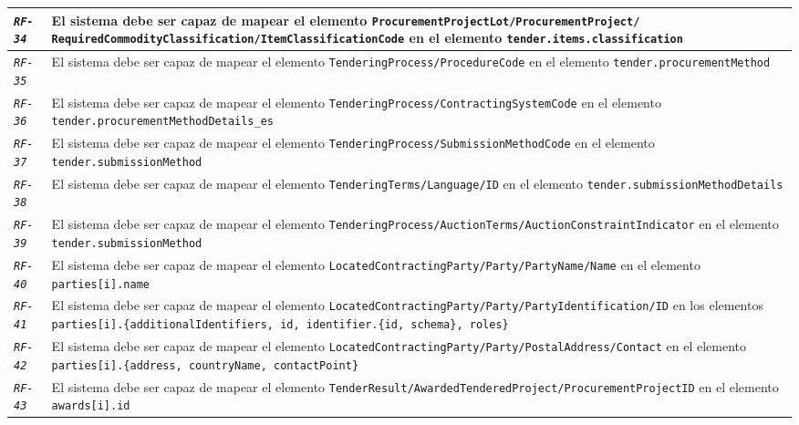 \begin{longtable}{|| M{3cm} | M{12cm} ||}
                \hline
                    \texttt{\textit{RF-34}} & El sistema debe ser capaz de mapear el elemento \texttt{ProcurementProjectLot/ProcurementProject/
                    RequiredCommodityClassification/ItemClassificationCode} en el elemento \texttt{tender.items.classification} \\
                \hline
                    \texttt{\textit{RF-35}} & El sistema debe ser capaz de mapear el elemento \texttt{TenderingProcess/ProcedureCode} en el elemento \texttt{tender.procurementMethod} \\
                \hline
                    \texttt{\textit{RF-36}} & El sistema debe ser capaz de mapear el elemento \texttt{TenderingProcess/ContractingSystemCode} en el elemento \texttt{tender.procurementMethodDetails\_es} \\
                \hline
                    \texttt{\textit{RF-37}} & El sistema debe ser capaz de mapear el elemento \texttt{TenderingProcess/SubmissionMethodCode} en el elemento \texttt{tender.submissionMethod} \\
                \hline
                    \texttt{\textit{RF-38}} & El sistema debe ser capaz de mapear el elemento \texttt{TenderingTerms/Language/ID} en el elemento \texttt{tender.submissionMethodDetails} \\
                \hline
                    \texttt{\textit{RF-39}} & El sistema debe ser capaz de mapear el elemento \texttt{TenderingProcess/AuctionTerms/AuctionConstraintIndicator} en el elemento \texttt{tender.submissionMethod} \\
                \hline
                    \texttt{\textit{RF-40}} & El sistema debe ser capaz de mapear el elemento \texttt{LocatedContractingParty/Party/PartyName/Name} en el elemento \texttt{parties[i].name} \\
                \hline
                    \texttt{\textit{RF-41}} & El sistema debe ser capaz de mapear el elemento \texttt{LocatedContractingParty/Party/PartyIdentification/ID} en los elementos \texttt{parties[i].\{additionalIdentifiers, id, identifier.\{id, schema\}, roles\}} \\
                \hline
                    \texttt{\textit{RF-42}} & El sistema debe ser capaz de mapear el elemento \texttt{LocatedContractingParty/Party/PostalAddress/Contact} en el elemento \texttt{parties[i].\{address, countryName, contactPoint\}} \\
                \hline
                    \texttt{\textit{RF-43}} & El sistema debe ser capaz de mapear el elemento \texttt{TenderResult/AwardedTenderedProject/ProcurementProjectID} en el elemento \texttt{awards[i].id} \\

\end{longtable}
